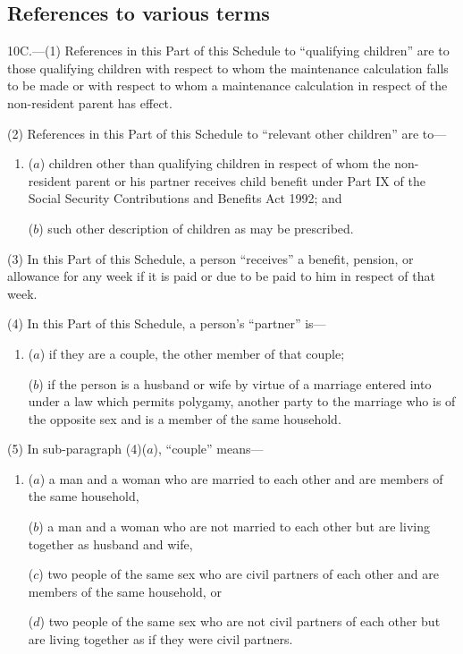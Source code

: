 \documentclass[a4paper]{article}
\begin{document}
{\subsection*{References to various terms}

10C.—(1) References in this Part of this Schedule to “qualifying children” are to those qualifying children with respect to whom the maintenance calculation falls to be made or with respect to whom a maintenance calculation in respect of the non-resident parent has effect.

(2) References in this Part of this Schedule to “relevant other children” are to---
\begin{enumerate}\item[]
($a$) children other than qualifying children in respect of whom the non-resident
parent or his partner receives child benefit under Part IX of the Social
Security Contributions and Benefits Act 1992; and

($b$) such other description of children as may be prescribed.
\end{enumerate}

(3) In this Part of this Schedule, a person “receives” a benefit, pension, or allowance for any week if it is paid or due to be paid to him in respect of that week.

(4) In this Part of this Schedule, a person’s “partner” is---
\begin{enumerate}\item[]
($a$) if they are a couple, the other member of that couple;

($b$) if the person is a husband or wife by virtue of a marriage entered into
under a law which permits polygamy, another party to the marriage who
is of the opposite sex and is a member of the same household.
\end{enumerate}

(5) In sub-paragraph (4)($a$), “couple” means---
\begin{enumerate}\item[]
($a$) a man and a woman who are married to each other and are members of
the same household,

($b$) a man and a woman who are not married to each other but are living
together as husband and wife,

($c$) two people of the same sex who are civil partners of each other and are
members of the same household, or

($d$) two people of the same sex who are not civil partners of each other but are
living together as if they were civil partners.
\end{enumerate}

}
\end{document}
